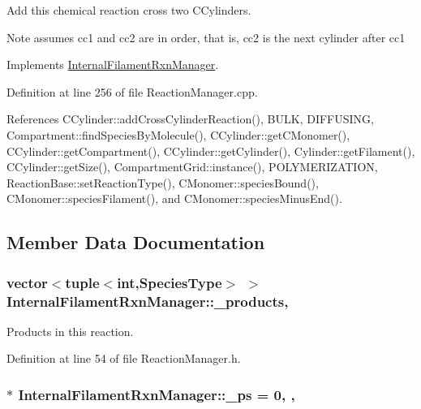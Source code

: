 Add this chemical reaction cross two C\+Cylinders. 

\begin{DoxyNote}{Note}
assumes cc1 and cc2 are in order, that is, cc2 is the next cylinder after cc1 
\end{DoxyNote}


Implements \hyperlink{classInternalFilamentRxnManager_ac8152bcd9f6aa5d69f85a98cff86d2b0}{Internal\+Filament\+Rxn\+Manager}.



Definition at line 256 of file Reaction\+Manager.\+cpp.



References C\+Cylinder\+::add\+Cross\+Cylinder\+Reaction(), B\+U\+L\+K, D\+I\+F\+F\+U\+S\+I\+N\+G, Compartment\+::find\+Species\+By\+Molecule(), C\+Cylinder\+::get\+C\+Monomer(), C\+Cylinder\+::get\+Compartment(), C\+Cylinder\+::get\+Cylinder(), Cylinder\+::get\+Filament(), C\+Cylinder\+::get\+Size(), Compartment\+Grid\+::instance(), P\+O\+L\+Y\+M\+E\+R\+I\+Z\+A\+T\+I\+O\+N, Reaction\+Base\+::set\+Reaction\+Type(), C\+Monomer\+::species\+Bound(), C\+Monomer\+::species\+Filament(), and C\+Monomer\+::species\+Minus\+End().



\subsection{Member Data Documentation}
\hypertarget{classInternalFilamentRxnManager_afd213da1a3706e2e88962e5da886a5dc}{
\subsubsection[{\+\_\+products}]{\setlength{\rightskip}{0pt plus 5cm}vector$<$tuple$<$int,{\bf Species\+Type}$>$ $>$ Internal\+Filament\+Rxn\+Manager\+::\+\_\+products\hspace{0.3cm}{\ttfamily [protected]}, {\ttfamily [inherited]}}}\label{classInternalFilamentRxnManager_afd213da1a3706e2e88962e5da886a5dc}


Products in this reaction. 



Definition at line 54 of file Reaction\+Manager.\+h.

\hypertarget{classInternalFilamentRxnManager_a973ce9cc2aae811e6867afa46193c5f2}{
\subsubsection[{\+\_\+ps}]{ $\ast$ Internal\+Filament\+Rxn\+Manager\+::\+\_\+ps = 0\hspace{0.3cm}{\ttfamily [static]}, {\ttfamily [protected]}, {\ttfamily [inherited]}}}\label{classInternalFilamentRxnManager_a973ce9cc2aae811e6867afa46193c5f2}


